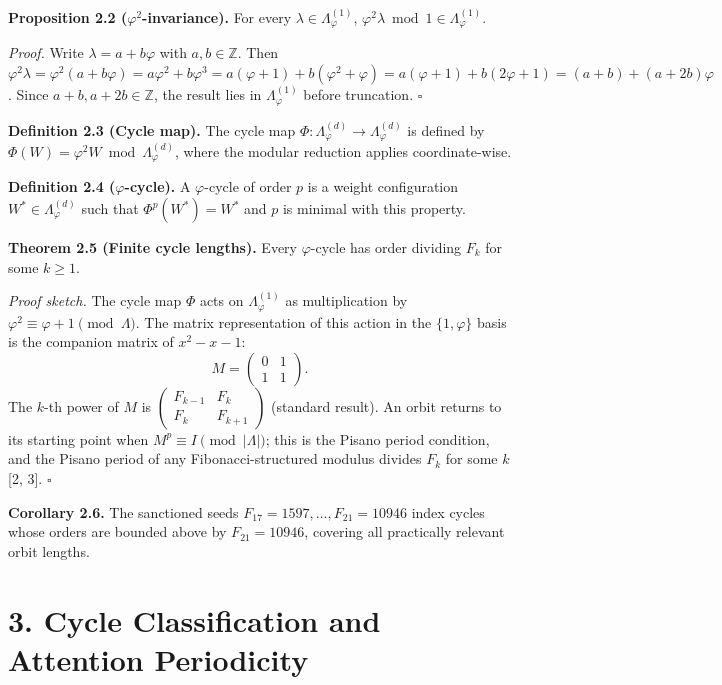 \textbf{Proposition 2.2
(\(\varphi^2\)-invariance).} For every
\(\lambda \in \Lambda_\varphi^{(1)}\),
\(\varphi^2 \lambda \bmod 1 \in \Lambda_\varphi^{(1)}\).

\emph{Proof.} Write \(\lambda = a + b\varphi\)
with \(a, b \in \mathbb{Z}\). Then
\(\varphi^2 \lambda = \varphi^2(a + b\varphi) = a\varphi^2 + b\varphi^3 = a(\varphi+1) + b(\varphi^2 + \varphi) = a(\varphi+1) + b(2\varphi+1) = (a+b) + (a+2b)\varphi\).
Since \(a+b, a+2b \in \mathbb{Z}\), the result
lies in \(\Lambda_\varphi^{(1)}\) before
truncation. \(\square\)

\textbf{Definition 2.3 (Cycle map).} The cycle map
\(\Phi: \Lambda_\varphi^{(d)} \to \Lambda_\varphi^{(d)}\)
is defined by
\(\Phi(W) = \varphi^2 W \bmod \Lambda_\varphi^{(d)}\),
where the modular reduction applies
coordinate-wise.

\textbf{Definition 2.4 (\(\varphi\)-cycle).} A
\(\varphi\)-cycle of order \(p\) is a weight
configuration \(W^* \in \Lambda_\varphi^{(d)}\)
such that \(\Phi^p(W^*) = W^*\) and \(p\) is
minimal with this property.

\textbf{Theorem 2.5 (Finite cycle lengths).} Every
\(\varphi\)-cycle has order dividing \(F_k\) for
some \(k \geq 1\).

\emph{Proof sketch.} The cycle map \(\Phi\) acts
on \(\Lambda_\varphi^{(1)}\) as multiplication by
\(\varphi^2 \equiv \varphi + 1 \pmod{\Lambda}\).
The matrix representation of this action in the
\(\{1, \varphi\}\) basis is the companion matrix
of \(x^2 - x - 1\):
\[M = \begin{pmatrix} 0 & 1 \\ 1 & 1 \end{pmatrix}.\]
The \(k\)-th power of \(M\) is
\(\begin{pmatrix} F_{k-1} & F_k \\ F_k & F_{k+1} \end{pmatrix}\)
(standard result). An orbit returns to its
starting point when
\(M^p \equiv I \pmod{|\Lambda|}\); this is the
Pisano period condition, and the Pisano period of
any Fibonacci-structured modulus divides \(F_k\)
for some \(k\) [2, 3]. \(\square\)

\textbf{Corollary 2.6.} The sanctioned seeds
\(F_{17}=1597, \ldots, F_{21}=10946\) index cycles
whose orders are bounded above by
\(F_{21}=10946\), covering all practically
relevant orbit lengths.

\section{3. Cycle Classification and Attention
Periodicity}\label{fa_25:cycle-classification-and-attention-periodicity}

